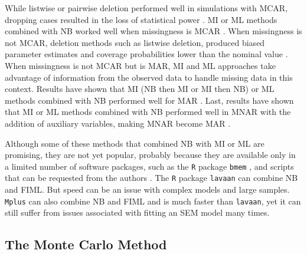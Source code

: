 \documentclass[man]{apa7}\usepackage[]{graphicx}\usepackage[]{xcolor}
\begin{document}
While listwise or pairwise deletion performed well in simulations with MCAR,
dropping cases resulted in the loss of statistical power
\parencite{Lib-Mediation-Missing-Data-Zhang-2012}.
MI or ML methods combined with NB worked well
when missingness is MCAR
\parencite{Lib-Mediation-Missing-Data-Zhang-2012,
Lib-Mediation-Missing-Data-Wu-2013,
Lib-Mediation-Missing-Data-Zhang-2015}.
When missingness is not MCAR,
deletion methods such as listwise deletion,
produced biased parameter estimates
and coverage probabilities lower than the nominal value
\parencite{Lib-Mediation-Missing-Data-Zhang-2012}.
When missingness is not MCAR but is MAR,
MI and ML approaches take advantage of information
from the observed data to handle missing data in this context.
Results have shown that MI (NB then MI or MI then NB) or ML methods
combined with NB performed well for MAR
\parencite{Lib-Mediation-Missing-Data-Zhang-2012,
Lib-Mediation-Missing-Data-Wu-2013,
Lib-Mediation-Missing-Data-Zhang-2015}.
Last,
results have shown that MI or ML methods combined with NB
performed well
in MNAR
with the addition of auxiliary variables,
making MNAR become MAR
\parencite{Lib-Mediation-Missing-Data-Zhang-2012,
Lib-Mediation-Missing-Data-Wu-2013,
Lib-Mediation-Missing-Data-Zhang-2015}.

Although some of these methods that combined NB with MI or ML are promising,
they are not yet popular,
probably because they are available
only in a limited number of software packages,
such as 
the \texttt{R} package \texttt{bmem}
\parencite{Lib-Mediation-Missing-Data-Zhang-2012},
and scripts that can be requested from the authors
\parencite{Lib-Mediation-Missing-Data-Wu-2013}.
The
\texttt{R}
package
\texttt{lavaan}
\parencite{Lib-Structural-Equation-Modeling-Software-Manuals-Rosseel-2012}
can combine NB and FIML.
But speed can be an issue with complex models and large samples.
\texttt{Mplus}
\parencite{Lib-Structural-Equation-Modeling-Software-Manuals-Muthen-2017}
can also combine NB and FIML
and is much faster than
\texttt{lavaan},
yet it can still suffer from
issues associated with fitting an SEM model many times.

\subsection{The Monte Carlo Method}
\end{document}
